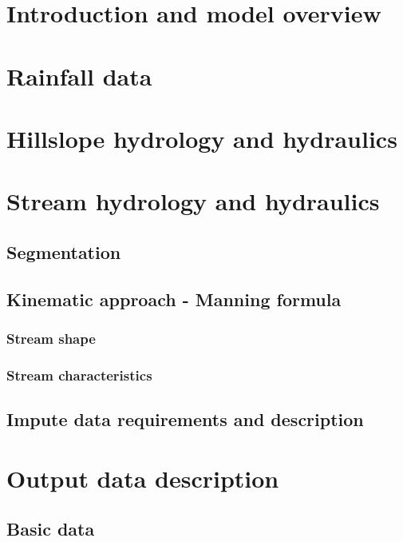 \section{Introduction and model overview}



\FloatBarrier
\section{Rainfall data}



\FloatBarrier
\section{Hillslope hydrology and hydraulics}



\FloatBarrier
\section{Stream hydrology and hydraulics}

    \subsection{Segmentation}
    \subsection{Kinematic approach - Manning formula}
        \subsubsection{Stream shape}
        \subsubsection{Stream characteristics}
    \subsection{Impute data requirements and description}

\FloatBarrier
\section{Output data description}

    \subsection{Basic data}
